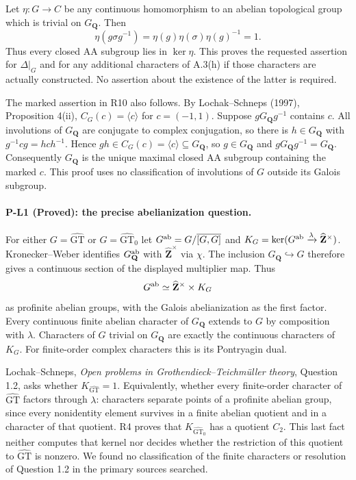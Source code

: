 Let $\eta:G\to C$ be any continuous homomorphism to an abelian
topological group which is trivial on $G_{\mathbf Q}$.  Then
\[
 \eta(g\sigma g^{-1})
 =\eta(g)\eta(\sigma)\eta(g)^{-1}=1.
\]
Thus every closed AA subgroup lies in $\ker\eta$.  This proves
the requested assertion for $\Delta|_G$ and for any additional
characters of A.3(h) if those characters are actually constructed.
No assertion about the existence of the latter is required.

The marked assertion in R10 also follows.  By
Lochak--Schneps (1997), Proposition 4(ii),
$C_G(c)=\langle c\rangle$ for $c=(-1,1)$.
Suppose $gG_{\mathbf Q}g^{-1}$ contains $c$.  All involutions of
$G_{\mathbf Q}$ are conjugate to complex conjugation, so there
is $h\in G_{\mathbf Q}$ with
$g^{-1}cg=hch^{-1}$.  Hence $gh\in C_G(c)=\langle c\rangle
\subseteq G_{\mathbf Q}$, so $g\in G_{\mathbf Q}$ and
$gG_{\mathbf Q}g^{-1}=G_{\mathbf Q}$.  Consequently
$G_{\mathbf Q}$ is the unique maximal closed AA subgroup
containing the marked $c$.  This proof uses no classification of
involutions of $G$ outside its Galois subgroup.

\paragraph{P-L1 (Proved): the precise abelianization question.}
For either $G=\widehat{\mathrm{GT}}$ or
$G=\widehat{\mathrm{GT}}_0$ let
$G^{\rm ab}=G/\overline{[G,G]}$ and
$K_G=\ker(G^{\rm ab}\xrightarrow{\lambda}\widehat{\mathbf Z}^{\times})$.
Kronecker--Weber identifies
$G_{\mathbf Q}^{\rm ab}$ with $\widehat{\mathbf Z}^{\times}$
via $\chi$.  The inclusion $G_{\mathbf Q}\hookrightarrow G$
therefore gives a continuous section of the displayed multiplier
map.  Thus
\[
 G^{\rm ab}\simeq\widehat{\mathbf Z}^{\times}\times K_G
\]
as profinite abelian groups, with the Galois abelianization as the
first factor.  Every continuous finite abelian character of
$G_{\mathbf Q}$ extends to $G$ by composition with $\lambda$.
Characters of $G$ trivial on $G_{\mathbf Q}$ are exactly the
continuous characters of $K_G$.  For finite-order complex
characters this is its Pontryagin dual.

Lochak--Schneps, \emph{Open problems in Grothendieck--Teichm\"uller
theory}, Question 1.2, asks whether $K_{\widehat{\mathrm{GT}}}=1$.
Equivalently, whether every finite-order character of
$\widehat{\mathrm{GT}}$ factors through $\lambda$: characters
separate points of a profinite abelian group, since every nonidentity
element survives in a finite abelian quotient and in a character
of that quotient.  R4 proves that
$K_{\widehat{\mathrm{GT}}_0}$ has a quotient $C_2$.
This last fact neither computes that kernel nor decides whether
the restriction of this quotient to $\widehat{\mathrm{GT}}$
is nonzero.  We found no classification of the finite characters
or resolution of Question 1.2 in the primary sources searched.

